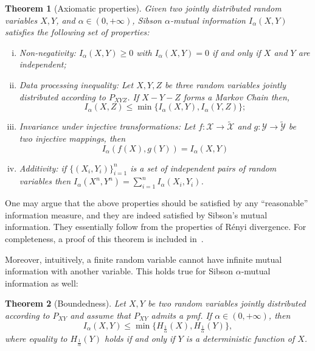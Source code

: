 \documentclass{article}
\newtheorem{theorem}{Theorem}
\numberwithin{theorem}{section}
\numberwithin{example}{section}
\numberwithin{remark}{section}
\numberwithin{definition}{section}
\newcommand{\X}{\mathcal{X}}
\newcommand{\Y}{\mathcal{Y}}
\begin{document}
\begin{theorem}[Axiomatic properties]\label{thm:properties}
    Given two jointly distributed random variables $X,Y$, and $\alpha\in (0,+\infty)$, Sibson $\alpha$-mutual information $I_\alpha(X,Y)$ satisfies the following set of properties:
    \begin{enumerate}[i)]
        \item Non-negativity: $I_\alpha(X,Y)\geq 0$ with $I_\alpha(X,Y)=0$ if and only if $X$ and $Y$ are independent\label{prop:nonNeg};
        \item Data processing inequality:  Let $X,Y,Z$ be three random variables jointly distributed according to $P_{XYZ}$. If $X-Y-Z$ forms a Markov Chain then, 
        \begin{equation} \label{thm:dpiIalpha}
        I_\alpha(X,Z)\leq \min \{I_\alpha(X,Y),I_\alpha(Y,Z)\};
    \end{equation}
        \item Invariance under injective transformations: Let $f:\X\to\tilde{\X}$ and $g:\Y\to\tilde{\Y}$ be two injective mappings, then \begin{equation} \label{thm:invarianceinjectivetransform}
    I_\alpha(f(X),g(Y))=I_\alpha(X,Y)
\end{equation}
     \item Additivity: if $\{(X_i,Y_i)\}_{i=1}^n$ is a set of independent pairs of random variables then $I_\alpha(X^n,Y^n)=\sum_{i=1}^n I_\alpha(X_i,Y_i)$\label{prop:add}.
    \end{enumerate}
\end{theorem}

One may argue that the above properties should be satisfied by any ``reasonable'' information measure, and they are indeed satisfied by Sibson's mutual information. They essentially follow from the properties of R\'enyi divergence. For completeness, a proof of this theorem is included in~. 

Moreover, intuitively, a finite random variable cannot have infinite mutual information with another variable. This holds true for Sibson $\alpha$-mutual information as well:



\begin{theorem}[Boundedness]\label{thm:boundsviaRenyi}
Let $X,Y$ be two random variables jointly distributed according to $P_{XY}$ and assume that $P_{XY}$ admits a pmf. If $\alpha\in (0,+\infty)$, then
\begin{equation}
    I_\alpha(X,Y) \leq \min \{ H_{\frac1\alpha}(X), H_{\frac{1}{\alpha}} (Y)\} ,\label{thm:boundsviaRenyi:boundX}
\end{equation}
where equality to $H_{\frac{1}{\alpha}} (Y)$ holds if and only if $Y$ is a deterministic function of $X$.
\end{theorem}
\end{document}
